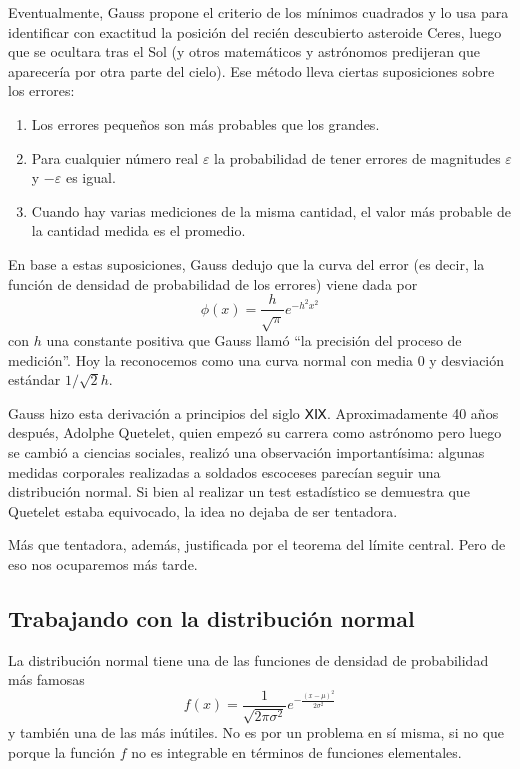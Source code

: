 Eventualmente, Gauss propone el criterio de los mínimos cuadrados y lo usa para identificar con exactitud la posición del recién descubierto asteroide Ceres, luego que se ocultara tras el Sol (y otros matemáticos y astrónomos predijeran que aparecería por otra parte del cielo). Ese método lleva ciertas suposiciones sobre los errores:
\begin{enumerate}
\item Los errores pequeños son más probables que los grandes.
\item Para cualquier número real \(\varepsilon\) la probabilidad de tener errores de magnitudes \(\varepsilon\) y \(-\varepsilon\) es igual.
\item Cuando hay varias mediciones de la misma cantidad, el valor más probable de la cantidad medida es el promedio.
\end{enumerate}

En base a estas suposiciones, Gauss dedujo que la curva del error (es decir, la función de densidad de probabilidad de los errores) viene dada por \[\phi(x) = \frac{h}{\sqrt{\pi}}e^{-h^2x^2}\] con \(h\) una constante positiva que Gauss llamó \enquote{la precisión del proceso de medición}. Hoy la reconocemos como una curva normal con media \num{0} y desviación estándar \(1/\sqrt{2}h\).

Gauss hizo esta derivación a principios del siglo ⅩⅨ. Aproximadamente 40 años después, Adolphe Quetelet, quien empezó su carrera como astrónomo pero luego se cambió a ciencias sociales, realizó una observación importantísima: algunas medidas corporales realizadas a soldados escoceses parecían seguir una distribución normal. Si bien al realizar un test estadístico se demuestra que Quetelet estaba equivocado, la idea no dejaba de ser tentadora. 

Más que tentadora, además, justificada por el teorema del límite central. Pero de eso nos ocuparemos más tarde.

\subsection{Trabajando con la distribución normal}
La distribución normal tiene una de las funciones de densidad de probabilidad más famosas \[f(x) = \frac{1}{\sqrt{2\pi\sigma^2}}e^{-\frac{(x-\mu)^2}{2\sigma^2}}\] y también una de las más inútiles. No es por un problema en sí misma, si no que porque la función \(f\) no es integrable en términos de funciones elementales.

